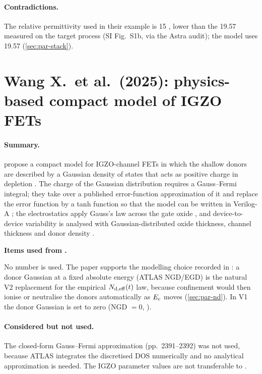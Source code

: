 \paragraph{Contradictions.}
The \HfO{} relative permittivity used in their example is 15 \citep[p.~2]{Pandey2025}, lower than the
19.57 measured on the target process (SI Fig.~S1b, via the Astra audit); the model uses 19.57
(\cref{sec:par-stack}).

\section{Wang X.\ et al.\ (2025): physics-based compact model of IGZO FETs}
\label{sec:lit-wangx2025}

\paragraph{Summary.}
\citet{WangX2025} propose a compact model for IGZO-channel FETs in which the shallow donors are
described by a Gaussian density of states that acts as positive charge in depletion
\citep[pp.~2390--2391]{WangX2025}. The charge of the Gaussian distribution requires a Gauss--Fermi
integral; they take over a published error-function approximation of it and replace the error
function by a tanh function so that the model can be written in Verilog-A
\citep[pp.~2391--2392]{WangX2025}; the electrostatics apply Gauss's law across the gate oxide
\citep[p.~2393]{WangX2025}, and device-to-device variability is analysed with Gaussian-distributed
oxide thickness, channel thickness and donor density \citep[p.~2396]{WangX2025}.

\begin{usedbox}
\textbf{Items used from \citet{WangX2025}.}\par\smallskip
\footnotesize
No number is used. The paper supports the modelling choice recorded in
: a donor Gaussian at a fixed absolute energy (ATLAS NGD/EGD)
is the natural V2 replacement for the empirical $N_{\mathrm{d,eff}}(t)$ law, because confinement would then
ionise or neutralise the donors automatically as $E_{\mathrm{c}}$ moves (\cref{sec:par-nd}). In V1 the donor
Gaussian is set to zero (NGD $= 0$, ).
\end{usedbox}

\paragraph{Considered but not used.}
The closed-form Gauss--Fermi approximation (pp.~2391--2392) was not used, because ATLAS integrates
the discretised DOS numerically and no analytical approximation is needed. The IGZO parameter values
are not transferable to \IWO.

